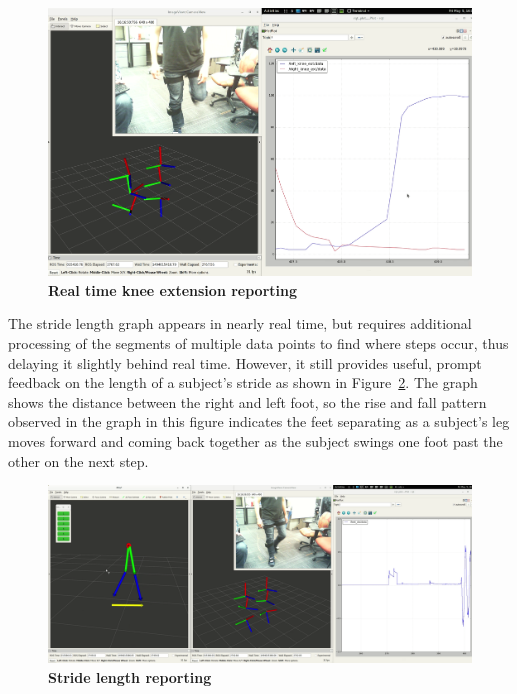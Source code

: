 \documentclass[conference]{IEEEtran}
\begin{document}
\begin{figure}[h]
  \centering
  \includegraphics[width=0.95\columnwidth]{figs/extend}
  \caption{{\bf Real time knee extension reporting}}
  \label{fig:extend }
\end{figure}

The stride length graph appears in nearly real time, but requires additional processing
of the segments of multiple data points to find where steps occur, thus delaying it
slightly behind real time. However, it still provides useful, prompt feedback on the
length of a subject's stride as shown in Figure~\ref{fig:length}. The graph shows the
distance between the right and left foot, so the rise and fall pattern observed in the
graph in this figure indicates the feet separating as a subject's leg moves forward and coming
back together as the subject swings one foot past the other on the next step. 

\begin{figure}[h]
  \centering
  \includegraphics[width=0.95\columnwidth]{figs/length}
  \caption{{\bf Stride length reporting}}
  \label{fig:length}
\end{figure}
\end{document}
